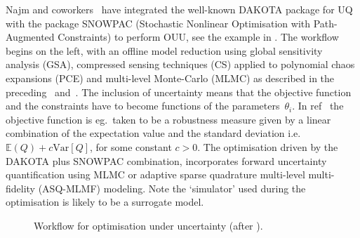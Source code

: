 Najm and coworkers~\cite{Ge19Prog} have integrated the well-known DAKOTA package for UQ~\cite{dakota6,dakotawebsite}
with the package SNOWPAC (Stochastic Nonlinear Optimisation 
with Path-Augmented Constraints) to perform OUU, see the example in .
The workflow begins on the left, with an offline model reduction using global sensitivity
analysis (GSA), compressed sensing techniques 
(CS) applied to polynomial chaos expansions (PCE) and multi-level Monte-Carlo (MLMC)
as described in the preceding ~and~. 
The inclusion of uncertainty means that the objective function and the constraints have to become functions of the parameters~$\theta_i$.
In ref~\cite{Ge19Prog} the objective function is eg.\ taken to be a robustness measure given by a linear combination of the 
expectation value and the standard deviation i.e. $\mathbb{E}(Q) + c \mathrm{Var}[Q]$,
for some constant $c>0$.  
The optimisation driven by the DAKOTA plus SNOWPAC combination, incorporates forward uncertainty quantification using MLMC or 
adaptive sparse quadrature multi-level multi-fidelity (ASQ-MLMF) modeling.  Note the `simulator' 
used during the optimisation is likely to be a surrogate model.


\begin{figure}
\centerline{}
\caption{\label{fig:ouuworkflow}
Workflow for optimisation under uncertainty (after \cite{Na18Unce}).}
\end{figure}

